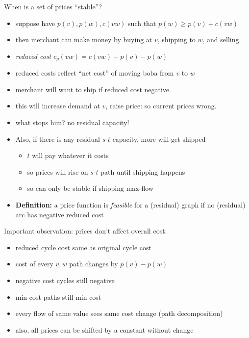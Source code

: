\documentclass{article}
\begin{document}
When is a set of prices ``stable''?
\begin{itemize}
\item suppose have $p(v),p(w),c(vw)$ such that $p(w) \ge p(v)+c(vw)$
\item then merchant can make money by buying at $v$, shipping to $w$,
  and selling.
\item {\em reduced cost} $c_p(vw) = c(vw)+p(v)-p(w)$
\item reduced costs reflect ``net cost'' of moving boba from $v$
  to $w$
\item merchant will want to ship if reduced cost negative.
\item this will increase demand at $v$, raise price: so current prices wrong.
\item what stops him?  no residual capacity!
\item Also, if there is any residual $s$-$t$ capacity, more will get
  shipped
\begin{itemize} 
\item $t$ will pay whatever it costs
\item so prices will rise on $s$-$t$ path until shipping happens
\item so can only be stable if shipping max-flow
\end{itemize}
\item {\bf Definition:} a price function is {\em feasible} for a (residual) graph if no (residual) arc has negative reduced cost
\end{itemize}

Important observation: prices don't affect overall cost:
\begin{itemize}
\item reduced cycle cost same as original cycle cost
\item cost of every $v,w$ path changes by $p(v)-p(w)$
\item negative cost cycles still negative
\item min-cost paths still min-cost
\item every flow of same value sees same cost change (path decomposition)
\item also, all prices can be shifted by a constant without change
\end{itemize}
\end{document}
